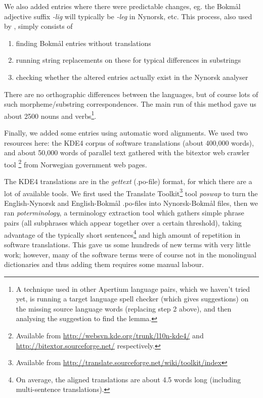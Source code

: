 \documentclass[11pt]{article}
\begin{document}
We also added entries where there were predictable changes, eg. the
Bokmål adjective suffix \emph{-lig} will typically be \emph{-leg} in Nynorsk,
etc. This process, also used by \citet[p.~4]{tyers2009dpm},
simply consists of
\begin{enumerate}
\item finding Bokmål entries without translations \item running string replacements on these for typical differences in
   substrings
\item checking whether the altered entries actually exist in the Nynorsk
   analyser
\end{enumerate}
There are no orthographic differences between the languages, but of
course lots of such morpheme/substring correspondences. The main run
of this method gave us about 2500 nouns and verbs\footnote{A technique
  used in other Apertium language pairs, which we haven't tried yet,
  is running a target language spell checker (which gives suggestions)
  on the missing source language words (replacing step 2 above), and
  then analysing the suggestion to find the lemma. }.

Finally, we added some entries using automatic word alignments. We
used two resources here: the KDE4 corpus of software translations
(about 400,000 words), and about 50,000 words of parallel text
gathered with the bitextor web crawler tool
\citep{sanchez2006eam}\footnote{Available
  from
  \href{http://websvn.kde.org/trunk/l10n-kde4/}{http://websvn.kde.org/trunk/l10n-kde4/}
  and
  \href{http://bitextor.sourceforge.net/}{http://bitextor.sourceforge.net/}
  respectively.} from Norwegian government web pages.

The KDE4 translations are in the \emph{gettext} (.po-file) format, for
which there are a lot of available tools. We first used the Translate
Toolkit\footnote{Available from
  \href{http://translate.sourceforge.net/wiki/toolkit/index}{http://translate.sourceforge.net/wiki/toolkit/index}
} tool \emph{poswap} to turn the English-Nynorsk and English-Bokmål
.po-files into Nynorsk-Bokmål files, then we ran \emph{poterminology},
a terminology extraction tool which gathers simple phrase pairs (all
subphrases which appear together over a certain threshold), taking
advantage of the typically short sentences\footnote{On average, the
  aligned translations are about 4.5 words long (including
  multi-sentence translations).} and high amount of repetition in
software translations. This gave us some hundreds of new terms with
very little work; however, many of the software terms were of course
not in the monolingual dictionaries and thus adding them requires some
manual labour.
\end{document}
